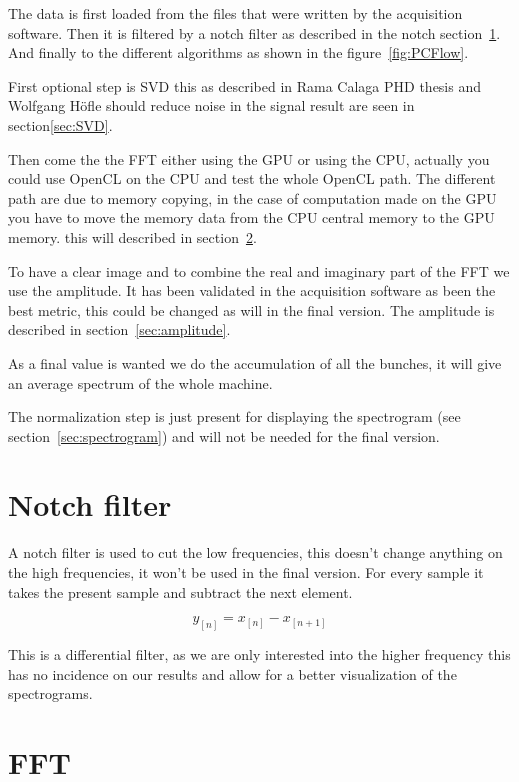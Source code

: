 	The data is first loaded from the files that were written by the acquisition software. Then it is filtered by a notch filter as described in the notch section~\ref{sec:notch}. And finally to the different algorithms as shown in the figure~\ref{fig:PCFlow}.

	First optional step is \gls{SVD} this as described in Rama Calaga PHD thesis\cite{calaga06} and Wolfgang H{\"o}fle\cite{HofleChamonix12} should reduce noise in the signal result are seen in section\ref{sec:SVD}.

	Then come the the \gls{FFT} either using the \gls{GPU} or using the \gls{CPU}, actually you could use \gls{OpenCL} on the \gls{CPU} and test the whole \gls{OpenCL} path. The different path are due to memory copying, in the case of computation made on the \gls{GPU} you have to move the memory data from the \gls{CPU} central memory to the \gls{GPU} memory. this will described in section~\ref{sec:FFT}.

	To have a clear image and to combine the real and imaginary part of the \gls{FFT} we use the amplitude. It has been validated in the acquisition software as been the best metric, this could be changed as will in the final version. The amplitude is described in section~\ref{sec:amplitude}.

	As a final value is wanted we do the accumulation of all the bunches, it will give an average spectrum of the whole machine.

	The normalization step is just present for displaying the spectrogram (see section~\ref{sec:spectrogram}) and will not be needed for the final version.
 
\section{Notch filter}
\label{sec:notch}

A notch filter is used to cut the low frequencies, this doesn't change anything on the high frequencies, it won't be used in the final version. For every sample it takes the present sample and subtract the next element.

$$y_{[n]} = x_{[n]} - x_{[n + 1]}$$

This is a differential filter, as we are only interested into the higher frequency this has no incidence on our results and allow for a better visualization of the spectrograms.

\section{FFT}
\label{sec:FFT}

